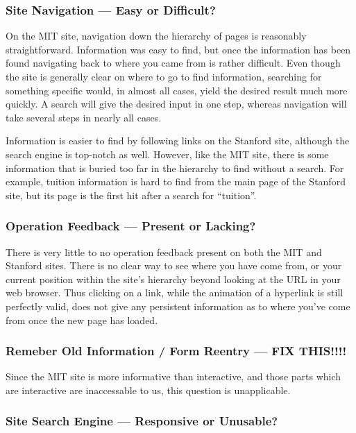 \subsubsection*{Site Navigation --- Easy or Difficult?}

On the MIT site, navigation down the hierarchy of pages is reasonably straightforward.
Information was easy to find, but once the information has been found navigating back
to where you came from is rather difficult. Even though the site is generally clear on
where to go to find information, searching for something specific would, in almost all
cases, yield the desired result much more quickly. A search will give the desired input
in one step, whereas navigation will take several steps in nearly all cases.

Information is easier to find by following links on the Stanford site, although
the search engine is top-notch as well. However, like the MIT site, there is some
information that is buried too far in the hierarchy to find without a search.
For example, tuition information is hard to find from the main page of the Stanford
site, but its page is the first hit after a search for ``tuition''.

\subsubsection*{Operation Feedback --- Present or Lacking?}

There is very little to no operation feedback present on both the MIT and Stanford sites.
There is no clear way to see where you have come from, or your current
position within the site's hierarchy beyond looking at the URL in your web browser. Thus
clicking on a link, while the animation of a hyperlink is still perfectly valid, does not
give any persistent information as to where you've come from once the new page has loaded.

\subsubsection*{Remeber Old Information / Form Reentry --- FIX THIS!!!!}

Since the MIT site is more informative than interactive, and those parts which are interactive
are inaccessable to us, this question is unapplicable.


\subsubsection*{Site Search Engine --- Responsive or Unusable?}


